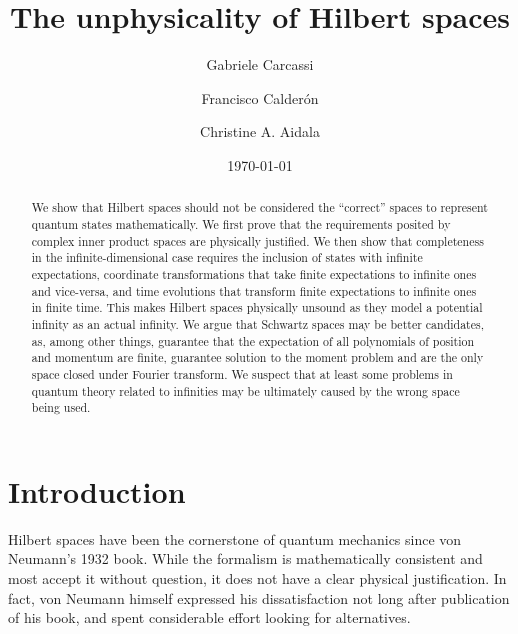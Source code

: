 \documentclass[10pt,twocolumn, nofootinbib]{revtex4-2}
\begin{document}
\title{The unphysicality of Hilbert spaces}
\author{Gabriele Carcassi}
\author{Francisco Calder\'on}
\author{Christine A. Aidala}

\date{\today}


\begin{abstract}
We show that Hilbert spaces should not be considered the ``correct'' spaces to represent quantum states mathematically. We first prove that the requirements posited by complex inner product spaces are physically justified. We then show that completeness in the infinite-dimensional case requires the inclusion of states with infinite expectations, coordinate transformations that take finite expectations to infinite ones and vice-versa, and time evolutions that transform finite expectations to infinite ones in finite time. This makes Hilbert spaces physically unsound as they model a potential infinity as an actual infinity. We argue that Schwartz spaces may be better candidates, as, among other things, guarantee that the expectation of all polynomials of position and momentum are finite, guarantee solution to the moment problem and are the only space closed under Fourier transform. We suspect that at least some problems in quantum theory related to infinities may be ultimately caused by the wrong space being used.
\end{abstract}

\maketitle

\section{Introduction}

Hilbert spaces have been the cornerstone of quantum mechanics since von Neumann's 1932 book.\cite{von_neumann_mathematische_1996} While the formalism is mathematically consistent and most accept it without question, it does not have a clear physical justification.\cite{heathcote_1990, hardy_2001} In fact, von Neumann himself expressed his dissatisfaction not long after publication of his book, and spent considerable effort looking for alternatives.\cite{vonNeumannHilbert_1996}
\end{document}
